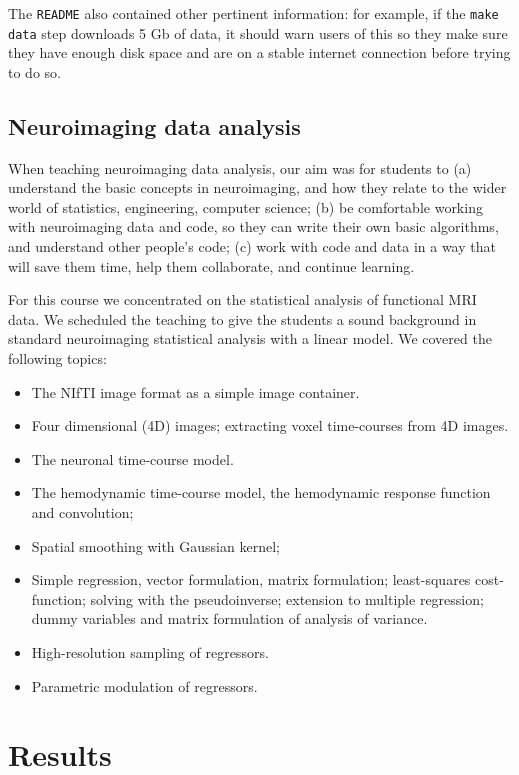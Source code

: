 The \texttt{README} also contained other pertinent information:
for example, if the \texttt{make data} step downloads 5 Gb of data, it should
warn users of this so they make sure they have enough disk space and are on a
stable internet connection before trying to do so.

\subsection{Neuroimaging data analysis}\label{analysis}

When teaching neuroimaging data analysis, our aim was for students to
(a) understand the basic concepts in neuroimaging,
and how they relate to the wider world of statistics, engineering, computer science;
(b) be comfortable working with neuroimaging data and code, so they can write
their own basic algorithms, and understand other people's code;
(c) work with code and data in a way that will save them time, help them collaborate,
and continue learning.%

For this course we concentrated on the statistical analysis of functional MRI
data.  We scheduled the teaching to give the students a sound background in
standard neuroimaging statistical analysis with a linear model.  We covered
the following topics:

\begin{itemize}

\item The NIfTI image format as a simple image container.
\item Four dimensional (4D) images; extracting voxel time-courses from 4D
    images.
\item The neuronal time-course model.
\item The hemodynamic time-course model, the hemodynamic response function and
    convolution;
\item Spatial smoothing with Gaussian kernel;
\item Simple regression, vector formulation, matrix formulation; least-squares
    cost-function; solving with the pseudoinverse; extension to multiple
        regression; dummy variables and matrix formulation of analysis of
        variance.
\item High-resolution sampling of regressors.
\item Parametric modulation of regressors.

\end{itemize}

\section{Results}\label{results}

